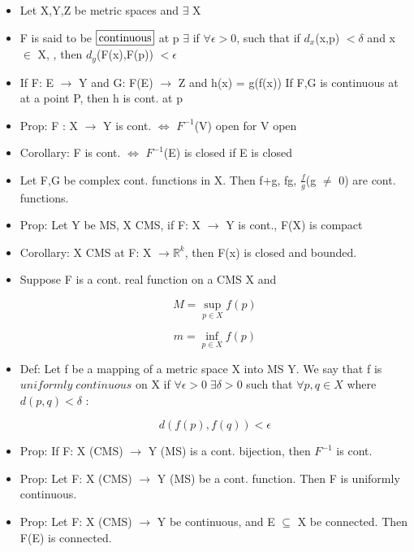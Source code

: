\documentclass[11pt]{article}
\newcommand{\boxinate}[1]{\framebox[1.1\width]{#1}}
\begin{document}
\begin{itemize}

\item Let X,Y,Z be metric spaces and $\exists$  X

\item F is said to be $\boxinate{continuous}$ at p $\exists$ if $\forall
  \epsilon >$0, such that if $d_{x}$(x,p) $< \delta$ and x $\in$ X, , then
  $d_y$(F(x),F(p)) $< \epsilon$


\item If F: E $\rightarrow$  Y and G: F(E) $\rightarrow$ Z and h(x) = g(f(x))
  If F,G is continuous at at a point P, then h is cont. at p



\item Prop: F : X $\rightarrow$ Y is cont. $\iff$ $F^{-1}$(V) open for V open


\item Corollary: F is cont. $\iff$ $F^{-1}$(E) is closed if E is closed

\item Let F,G be complex cont. functions in X. Then f+g, fg, $\frac{f}{g}$(g
  $\neq$ 0) are cont. functions.


\item Prop: Let Y be MS, X CMS, if F: X $\rightarrow$ Y is cont., F(X) is
  compact


\item Corollary: X CMS at F: X $\rightarrow \mathbb{R}^k$, then F(x) is closed
  and bounded.

\item Suppose F is a cont. real function on a CMS X and

  $$M = \sup_{p \in X}f(p)$$

  $$m = \inf_{p \in X}f(p)$$

\item Def: Let f be a mapping of a metric space X into MS Y. We say that f is $uniformly \; continuous$ on X if $\forall \epsilon > 0 \; \exists \delta > 0$ such that $\forall p,q \in X$ where $d(p,q) < \delta$ :

$$ d(f(p),f(q)) < \epsilon $$

\item Prop: If F: X (CMS) $\rightarrow$ Y (MS) is a cont. bijection, then
  $F^{-1}$ is cont.

\item Prop: Let F: X (CMS) $\rightarrow$ Y (MS) be a cont. function. Then F is
  uniformly continuous.

\item Prop: Let F: X (CMS) $\rightarrow$ Y be continuous, and E $\subseteq$ X
  be connected. Then F(E) is connected.


\end{itemize}
\end{document}
